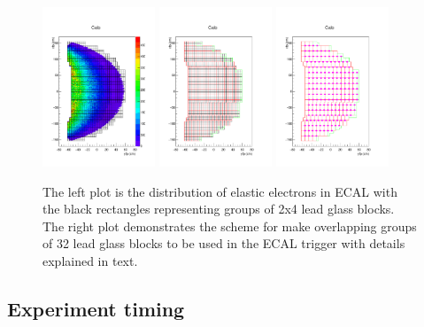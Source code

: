 \documentclass{article}
\begin{document}
 
 \begin{figure}
 	\centering
 	\includegraphics[width=0.3\textwidth]{cfpbox.pdf}
 	\includegraphics[width=0.3\textwidth]{cfpc.pdf}
 	 	\includegraphics[width=0.3\textwidth]{cgr32.pdf}
 	 	\caption{The left plot is the distribution of elastic electrons in ECAL with the black rectangles representing
 		groups of 2x4 lead glass blocks. The right plot demonstrates
 		the scheme for make overlapping groups of 32 lead glass blocks to be used in the ECAL trigger with
 		details explained in text.  }\label{fig:ECALTrig}
 \end{figure}
 
\subsection {Experiment timing}
\end{document}
